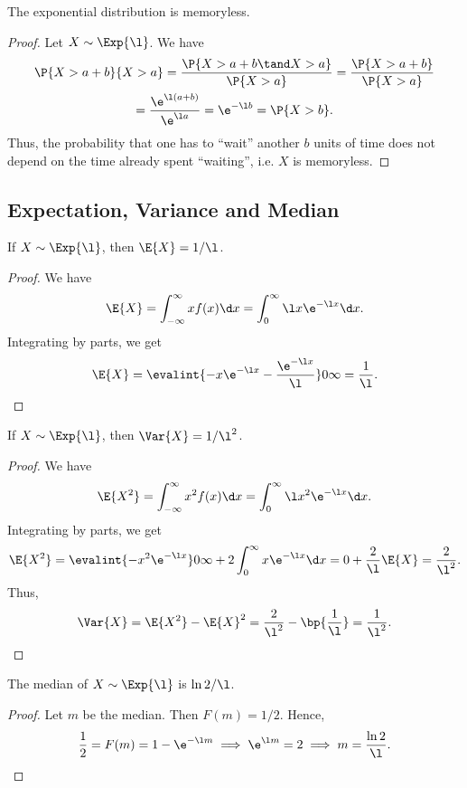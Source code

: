 \begin{proposition}
    The exponential distribution is memoryless.
\end{proposition}
\begin{proof}
    Let $X \sim \Exp{\l}$. We have
    \begin{gather*}
        \P{X > a + b}{X > a} = \frac{\P{X > a + b \tand X > a}}{\P{X > a}} = \frac{\P{X > a + b}}{\P{X > a}} \\
        = \frac{\e^{\l (a + b)}}{\e^{\l a}} = \e^{-\l b} = \P{X > b}.
    \end{gather*}
    Thus, the probability that one has to ``wait'' another $b$ units of time does not depend on the time already spent ``waiting'', i.e. $X$ is memoryless.
\end{proof}

\subsection{Expectation, Variance and Median}

\begin{proposition}
    If $X \sim \Exp{\l}$, then $\E{X} = 1/\l$.
\end{proposition}
\begin{proof}
    We have \[\E{X} = \int_{-\infty}^\infty x f(x) \d x = \int_0^\infty \l x \e^{-\l x} \d x.\] Integrating by parts, we get \[\E{X} = \evalint{-x\e^{-\l x} - \frac{\e^{-\l x}}{\l}}0\infty = \frac1\l.\]
\end{proof}

\begin{proposition}
    If $X \sim \Exp{\l}$, then $\Var{X} = 1/\l^2$.
\end{proposition}
\begin{proof}
    We have \[\E{X^2} = \int_{-\infty}^\infty x^2 f(x) \d x = \int_0^\infty \l x^2 \e^{-\l x} \d x.\] Integrating by parts, we get \[\E{X^2} = \evalint{-x^2 \e^{-\l x}}0\infty + 2\int_0^\infty x \e^{-\l x} \d x = 0 + \frac2\l \E{X} = \frac2{\l^2}.\] Thus, \[\Var{X} = \E{X^2} - \E{X}^2 = \frac{2}{\l^2} - \bp{\frac1\l} = \frac1{\l^2}.\]
\end{proof}

\begin{proposition}
    The median of $X \sim \Exp{\l}$ is $\ln 2 / \l$.
\end{proposition}
\begin{proof}
    Let $m$ be the median. Then $F(m) = 1/2$. Hence, \[\frac12 = F(m) = 1 - \e^{-\l m} \implies \e^{\l m} = 2 \implies m = \frac{\ln 2}{\l}.\]
\end{proof}


